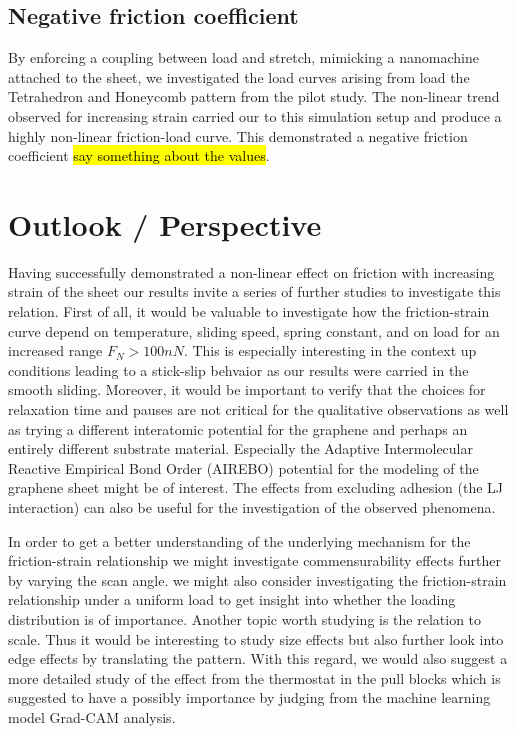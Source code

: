 \subsection{Negative friction coefficient}
By enforcing a coupling between load and stretch, mimicking a nanomachine attached to the sheet, we investigated the load curves arising from load the Tetrahedron and Honeycomb pattern from the pilot study. The non-linear trend observed for increasing strain carried our to this simulation setup and produce a highly non-linear friction-load curve. This demonstrated a negative friction coefficient \hl{say something about the values}.



\section{Outlook / Perspective}

Having successfully demonstrated a non-linear effect on friction with increasing
strain of the sheet our results invite a series of further studies to investigate this relation. First of all, it would be valuable to investigate how the friction-strain curve depend on temperature, sliding speed, spring constant, and on load for an increased range $F_N > 100 nN$. This is especially interesting in the context up conditions leading to a stick-slip behvaior as our results were carried in the smooth sliding. Moreover, it would be important to verify that the choices for relaxation time and pauses are not critical for the qualitative observations as well as trying a different
interatomic potential for the graphene and perhaps an entirely different
substrate material. Especially the Adaptive Intermolecular Reactive Empirical
Bond Order (AIREBO) potential for the modeling of the graphene sheet might be of interest. The effects from excluding adhesion (the \acrshort{LJ} interaction) can also be useful for the investigation of the observed phenomena. 


In order to get a better understanding of the underlying mechanism for the friction-strain relationship we might investigate commensurability effects further by varying the scan angle. we might also consider investigating the friction-strain relationship under a uniform load to get insight into whether the loading distribution is of importance. Another topic worth studying is the relation to scale. Thus it would be interesting to study size effects but also further look into edge effects by translating the pattern. With this regard, we would also suggest a more detailed study of the effect from the thermostat in the pull blocks which is suggested to have a possibly importance by judging from the machine learning model Grad-CAM analysis. 

